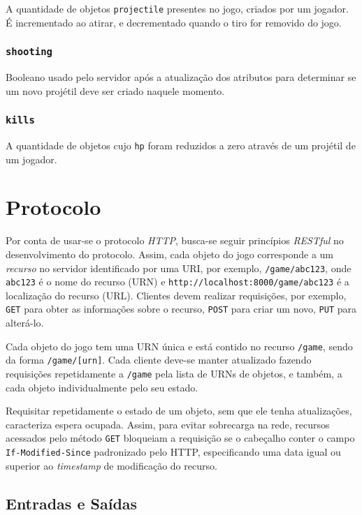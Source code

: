 \documentclass[12pt,a4paper]{article}
\begin{document}
A quantidade de objetos \texttt{projectile} presentes no jogo, criados por um
jogador. É incrementado ao atirar, e decrementado quando o tiro for removido do
jogo.

\subsubsection{\texttt{shooting}}

Booleano usado pelo servidor após a atualização dos atributos para determinar
se um novo projétil deve ser criado naquele momento.

\subsubsection{\texttt{kills}}

A quantidade de objetos cujo \texttt{hp} foram reduzidos a zero através de um
projétil de um jogador.

\pagebreak \section{Protocolo}

Por conta de usar-se o protocolo \textit{HTTP}, busca-se seguir princípios
\textit{RESTful} no desenvolvimento do protocolo. Assim, cada objeto do jogo
corresponde a um \textit{recurso} no servidor identificado por uma URI, por
exemplo, \texttt{/game/abc123}, onde \texttt{abc123} é o nome do recurso (URN)
e \texttt{http://localhost:8000/game/abc123} é a localização do recurso (URL).
Clientes devem realizar requisições, por exemplo, \texttt{GET} para obter as
informações sobre o recurso, \texttt{POST} para criar um novo, \texttt{PUT}
para alterá-lo.

Cada objeto do jogo tem uma URN única e está contido no recurso \texttt{/game},
sendo da forma \texttt{/game/[urn]}. Cada cliente deve-se manter atualizado
fazendo requisições repetidamente a \texttt{/game} pela lista de URNs de
objetos, e também, a cada objeto individualmente pelo seu estado.

Requisitar repetidamente o estado de um objeto, sem que ele tenha atualizações,
caracteriza espera ocupada. Assim, para evitar sobrecarga na rede, recursos
acessados pelo método \texttt{GET} bloqueiam a requisição se o cabeçalho conter
o campo \texttt{If-Modified-Since} padronizado pelo HTTP, especificando uma
data igual ou superior ao \textit{timestamp} de modificação do recurso.

\subsection{Entradas e Saídas}
\end{document}
